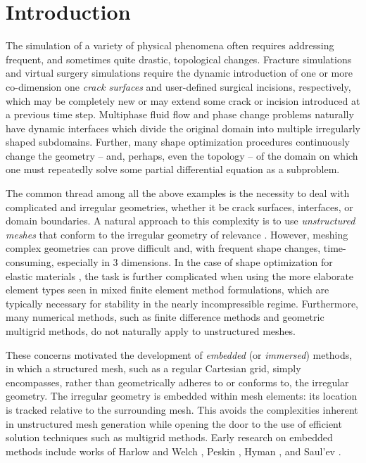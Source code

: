 %

{}
\part*{\Huge Introduction}

The simulation of a variety of physical phenomena often requires addressing frequent, and sometimes quite drastic, topological changes. Fracture simulations and virtual surgery simulations require the dynamic introduction of one or more co-dimension one \emph{crack surfaces} and user-defined surgical incisions, respectively, which may be completely new or may extend some crack or incision introduced at a previous time step. Multiphase fluid flow and phase change problems naturally have dynamic interfaces which divide the original domain into multiple irregularly shaped subdomains. Further, many shape optimization procedures continuously change the geometry -- and, perhaps, even the topology -- of the domain on which one must repeatedly solve some partial differential equation as a subproblem.

The common thread among all the above examples is the necessity to deal with complicated and irregular geometries, whether it be crack surfaces, interfaces, or domain boundaries. A natural approach to this complexity is to use \emph{unstructured meshes} that conform to the irregular geometry of relevance \cite{Babuska70, Bramble96, Wohlmuth99, Chen96, Huang02, Lamichhane04, Dryja05, Cockburn09}. However, meshing complex geometries can prove difficult and, with frequent shape changes, time-consuming, especially in $3$ dimensions. In the case of shape optimization for elastic materials \cite{Sethian00, Osher01, Allaire04, Duysinx06, Challis08, Wei.Peng08}, the task is further complicated when using the more elaborate element types seen in mixed finite element method formulations, which are typically necessary for stability in the nearly incompressible regime. Furthermore, many numerical methods, such as finite difference methods and geometric multigrid methods, do not naturally apply to unstructured meshes.

These concerns motivated the development of \emph{embedded} (or \emph{immersed}) methods, in which a structured mesh, such as a regular Cartesian grid, simply encompasses, rather than geometrically adheres to or conforms to, the irregular geometry. The irregular geometry is embedded within mesh elements: its location is tracked relative to the surrounding mesh. This avoids the complexities inherent in unstructured mesh generation while opening the door to the use of efficient solution techniques such as multigrid methods. Early research on embedded methods include works of Harlow and Welch \cite{Harlow65}, Peskin \cite{Peskin72}, Hyman \cite{Hyman52}, and Saul'ev \cite{Saul'ev63}.

